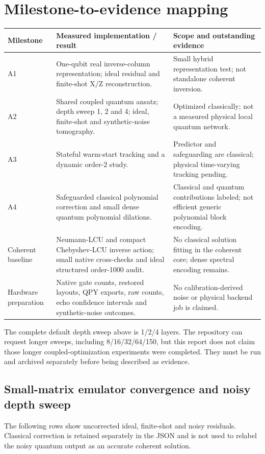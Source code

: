 \documentclass[11pt,a4paper]{article}
\begin{document}
\section{Milestone-to-evidence mapping}
{\small
\begin{longtable}{@{}p{27mm}p{72mm}p{52mm}@{}}\toprule
Milestone & Measured implementation / result & Scope and outstanding evidence\\\midrule
A1 & One-qubit real inverse-column representation; ideal residual and
finite-shot X/Z reconstruction. & Small hybrid representation test; not
standalone coherent inversion.\\[3mm]
A2 & Shared coupled quantum ansatz; depth sweep 1, 2 and 4; ideal,
finite-shot and synthetic-noise tomography. & Optimized classically;
not a measured physical local quantum network.\\[3mm]
A3 & Stateful warm-start tracking and a dynamic order-2 study. & Predictor
and safeguarding are classical; physical time-varying tracking pending.\\[3mm]
A4 & Safeguarded classical polynomial correction and small dense quantum
polynomial dilations. & Classical and quantum contributions labeled;
not efficient generic polynomial block encoding.\\[3mm]
Coherent baseline & Neumann-LCU and compact Chebyshev-LCU inverse action;
small native cross-checks and ideal structured order-1000 audit. & No
classical solution fitting in the coherent core; dense spectral encoding remains.\\[3mm]
Hardware preparation & Native gate counts, restored layouts, QPY exports,
raw counts, echo confidence intervals and synthetic-noise outcomes. & No
calibration-derived noise or physical backend job is claimed.\\\bottomrule
\end{longtable}
}

The complete default depth sweep above is 1/2/4 layers. The repository can
request longer sweeps, including 8/16/32/64/150, but this report does not
claim those longer coupled-optimization experiments were completed. They
must be run and archived separately before being described as evidence.

\subsection{Small-matrix emulator convergence and noisy depth sweep}
The following rows show uncorrected ideal, finite-shot and noisy residuals.
Classical correction is retained separately in the JSON and is not used
to relabel the noisy quantum output as an accurate coherent solution.
\end{document}
